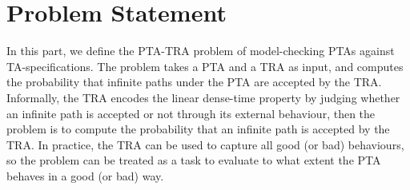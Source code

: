 \section{Problem Statement}
In this part, we define the {\sc PTA-TRA} problem of model-checking {PTAs} against TA-specifications.
The problem takes a PTA and a TRA as input, and computes the probability that infinite paths under the PTA are accepted by the TRA.
Informally, the TRA encodes the linear dense-time property by judging whether an infinite path is accepted or not through its external behaviour,
then the problem is to compute the probability that an infinite path is accepted by the TRA.
In practice, the TRA can be used to capture all good (or bad) behaviours, so the problem can be treated as a task to evaluate to what extent the PTA behaves in a good (or bad) way.

